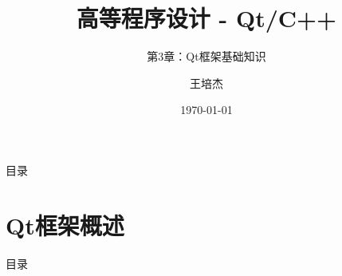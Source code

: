 \documentclass[UTF8,aspectratio=169]{beamer}
\title{高等程序设计 - Qt/C++}
\subtitle{第3章：Qt框架基础知识}
\author{王培杰}
\institute{长江大学地球物理与石油资源学院}
\date{\today}
\begin{document}
\begin{frame}
    \titlepage
\end{frame}

\begin{frame}{目录}
    \begin{multicols}{2}
        \tableofcontents[]
    \end{multicols}
\end{frame}


\section{Qt框架概述}
\begin{frame}{目录}
    \begin{multicols}{2}
        \tableofcontents[currentsection]
    \end{multicols}
\end{frame}
\end{document}
